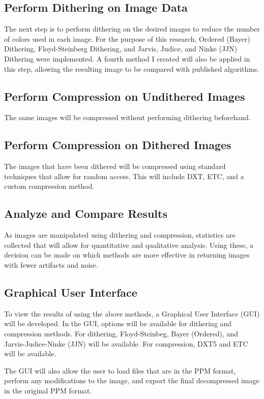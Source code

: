 \documentclass[12pt]{CPP}
\begin{document}
\subsection{Perform Dithering on Image Data}
The next step is to perform dithering on the desired images to reduce the number of colors used in each image. For the purpose of this research, Ordered (Bayer) Dithering, Floyd-Steinberg Dithering, and Jarvis, Judice, and Ninke  (JJN) Dithering were implemented. A fourth method I created will also be applied in this step, allowing the resulting image to be compared with published algorithms.

\subsection{Perform Compression on Undithered Images}
The same images will be compressed without performing dithering beforehand.

\subsection{Perform Compression on Dithered Images}
The images that have been dithered will be compressed using standard techniques that allow for random access. This will include DXT, ETC, and a custom compression method.

\subsection{Analyze and Compare Results}
As images are manipulated using dithering and compression, statistics are collected that will allow for quantitative and qualitative analysis. Using these, a decision can be made on which methods are more effective in returning images with fewer artifacts and noise.

\subsection{Graphical User Interface}
To view the results of using the above methods, a Graphical User Interface (GUI) will be developed. In the GUI, options will be available for dithering and compression methods. For dithering, Floyd-Steinbeg, Bayer (Ordered), and Jarvis-Judice-Ninke (JJN) will be available. For compression, DXT5 and ETC will be available.

The GUI will also allow the user to load files that are in the PPM format, perform any modifications to the image, and export the final decompressed image in the original PPM format.
\end{document}

